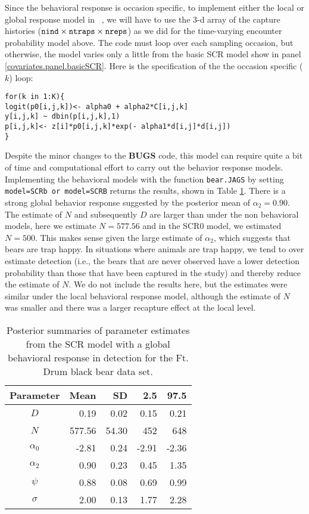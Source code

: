 Since the behavioral response is occasion specific, to implement either the local or global 
response model in \jags~, we will have to use the 3-d array of the
capture histories ($\mbox{\tt nind} \times \mbox{\tt ntraps} \times
\mbox{\tt nreps}$) as we did for the time-varying encounter probability
model above. The code must loop over each sampling occasion, but otherwise, the model
varies only a little from the basic SCR model show in panel \ref{covariates.panel.basicSCR}.  
Here is the specification of the the occasion specific ($k$) loop:

{\small
\begin{verbatim}
for(k in 1:K){
logit(p0[i,j,k])<- alpha0 + alpha2*C[i,j,k]
y[i,j,k] ~ dbin(p[i,j,k],1)
p[i,j,k]<- z[i]*p0[i,j,k]*exp(- alpha1*d[i,j]*d[i,j])
}
\end{verbatim}
}

Despite the minor changes to the {\bf BUGS} code, this model can require quite a bit of time and computational 
effort to carry out the behavior response models.  Implementing the behavioral models with the function {\tt bear.JAGS} by setting {\tt
model=SCRb or model=SCRB}  returns the results, shown in Table \ref{covariates.tab.SCRb}.  There is a strong
global behavior response suggested by the posterior mean of $\alpha_2 = 0.90$.  The estimate of $N$ and subsequently $D$ are larger 
than under the non behavioral models, here we estimate $N = 577.56$ and in the SCR0 model, we estimated $N = 500$. 
This makes sense given the large estimate of $\alpha_2$, which suggests that bears
are trap happy.  In situations where animals are trap happy, we tend to over estimate detection (i.e., the bears that are 
never observed have a lower detection probability than those that have been captured in the study) and thereby reduce the 
estimate of $N$.  We do not include the results here, but the estimates were similar under the local behavioral response
model, although the estimate of $N$ was smaller and there was a larger recapture effect at the local level.  

\begin{table}[ht]
\centering
\caption{Posterior summaries of parameter estimates from the SCR model with a 
global behavioral response in detection for the Ft. Drum black bear data set.}
\begin{tabular}{crrrr}
\hline
Parameter & Mean & SD & 2.5 & 97.5 \\
\hline
$D$           &    0.19     &  0.02    & 0.15 & 0.21 \\
$N$           &   577.56 &  54.30  & 452  & 648  \\
$\alpha_0$  &    -2.81     & 0.24    & -2.91  & -2.36  \\
$\alpha_2$  & 0.90  &  0.23   & 0.45  &  1.35 \\
$\psi$  &   0.88 &  0.08  &  0.69 & 0.99  \\
$\sigma$ & 2.00 &  0.13  &   1.77 & 2.28  \\
\end{tabular}
\label{covariates.tab.SCRb}
\end{table}


